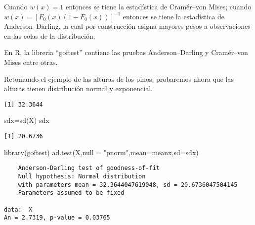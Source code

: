 \documentclass[
  a4paper,
  oneside,
  openany]{book}
\newenvironment{Shaded}{\begin{snugshade}}{\end{snugshade}}
\newcommand{\AttributeTok}[1]{\textcolor[rgb]{0.77,0.63,0.00}{#1}}
\newcommand{\FunctionTok}[1]{\textcolor[rgb]{0.00,0.00,0.00}{#1}}
\newcommand{\NormalTok}[1]{#1}
\newcommand{\OtherTok}[1]{\textcolor[rgb]{0.56,0.35,0.01}{#1}}
\newcommand{\SpecialCharTok}[1]{\textcolor[rgb]{0.00,0.00,0.00}{#1}}
\newcommand{\StringTok}[1]{\textcolor[rgb]{0.31,0.60,0.02}{#1}}
\begin{document}
Cuando \(w(x)=1\) entonces se tiene la estadística de Cramér--von Mises; cuando \(w(x)=[F_0(x)(1-F_0(x))]^{-1}\) entonces se tiene la estadística de Anderson--Darling, la cual por construcción asigna mayores pesos a observaciones en las colas de la distribución.

En R, la libreria ``goftest'' contiene las pruebas Anderson--Darling y Cramér--von Mises entre otras.

Retomando el ejemplo de las alturas de los pinos, probaremos ahora que las alturas tienen distribución normal y exponencial.

\begin{Shaded}
\end{Shaded}

\begin{verbatim}
[1] 32.3644
\end{verbatim}

\begin{Shaded}
\begin{Highlighting}[]
\NormalTok{sdx}\OtherTok{=}\FunctionTok{sd}\NormalTok{(X)}
\NormalTok{sdx}
\end{Highlighting}
\end{Shaded}

\begin{verbatim}
[1] 20.6736
\end{verbatim}

\begin{Shaded}
\begin{Highlighting}[]
\FunctionTok{library}\NormalTok{(goftest)}
\FunctionTok{ad.test}\NormalTok{(X,}\AttributeTok{null =} \StringTok{"pnorm"}\NormalTok{,}\AttributeTok{mean=}\NormalTok{meanx,}\AttributeTok{sd=}\NormalTok{sdx)}
\end{Highlighting}
\end{Shaded}

\begin{verbatim}
    Anderson-Darling test of goodness-of-fit
    Null hypothesis: Normal distribution
    with parameters mean = 32.3644047619048, sd = 20.6736047504145
    Parameters assumed to be fixed

data:  X
An = 2.7319, p-value = 0.03765
\end{verbatim}
\end{document}
